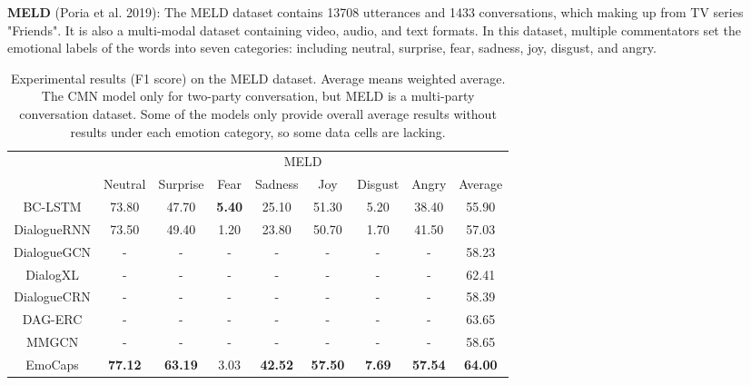 \noindent\textbf{MELD} (Poria et al. 2019): The MELD dataset contains 13708 utterances and 1433 conversations, which making up from TV series "Friends". It is also a multi-modal dataset containing video, audio, and text formats. In this dataset, multiple commentators set the emotional labels of the words into seven categories: including neutral, surprise, fear, sadness, joy, disgust, and angry.
\begin{table*}[]
	\centering
	\begin{tabular}{c|c|c|c|c|c|c|c|c}
		\hline
		& \multicolumn{8}{c}{MELD}                                                                                                           \\ \cline{2-9} 
		& Neutral        & Surprise       & Fear          & Sadness        & Joy            & Disgust       & Angry          & Average        \\ \hline
		BC-LSTM        & 73.80          & 47.70          & \textbf{5.40} & 25.10          & 51.30          & 5.20          & 38.40          & 55.90          \\
	
		DialogueRNN    & 73.50          & 49.40          & 1.20          & 23.80          & 50.70          & 1.70          & 41.50          & 57.03          \\
		DialogueGCN    & -              & -              & -             & -              & -              & -             & -              & 58.23          \\
		DialogXL       & -              & -              & -             & -              & -              & -             & -              & 62.41          \\
		DialogueCRN       & -              & -              & -             & -              & -              & -             & -              & 58.39          \\
		DAG-ERC       & -              & -              & -             & -              & -              & -             & -              & 63.65          \\
		MMGCN          & -              & -              & -             & -              & -              & -             & -              & 58.65          \\ \hline
		EmoCaps & \textbf{77.12} & \textbf{63.19} & 3.03          & \textbf{42.52} & \textbf{57.50} & \textbf{7.69} & \textbf{57.54} & \textbf{64.00} \\ \hline
	\end{tabular}
	\caption{Experimental results (F1 score) on the MELD dataset. Average means weighted average. The CMN model only for two-party conversation, but MELD is a multi-party conversation dataset. Some of the models only provide overall average results without results under each emotion category, so some data cells are lacking. }
\end{table*}
